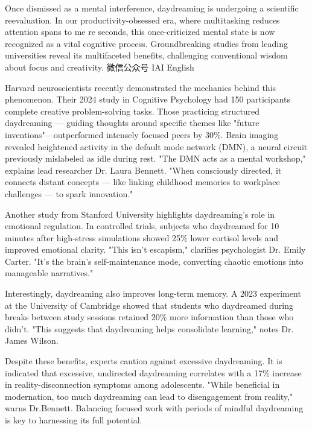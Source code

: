 \documentclass{英语试卷}
\begin{document}
\par Once dismissed as a mental interference, daydreaming is undergoing a scientific reevaluation. In our productivity-obsessed era, where multitasking reduces attention spans to me re seconds, this once-criticized mental state is now recognized as a vital cognitive process. Groundbreaking studies from leading universities reveal its multifaceted benefits, challenging conventional wisdom about focus and creativity. 微信公众号 IAI English\par
\par Harvard neuroscientists recently demonstrated the mechanics behind this phenomenon. Their 2024 study in Cognitive Psychology had 150 participants complete creative problem-solving tasks. Those practicing structured daydreaming — guiding thoughts around specific themes like "future inventions"—outperformed intensely focused peers by 30\%. Brain imaging revealed heightened activity in the default mode network (DMN), a neural circuit previously mislabeled as idle during rest. "The DMN acts as a mental workshop," explains lead researcher Dr. Laura Bennett. "When consciously directed, it connects distant concepts — like linking childhood memories to workplace challenges — to spark innovation."\par
\par Another study from Stanford University highlights daydreaming's role in emotional regulation. In controlled trials, subjects who daydreamed for 10 minutes after high-stress simulations showed 25\% lower cortisol levels and improved emotional clarity. "This isn't escapism," clarifies psychologist Dr. Emily Carter. "It's the brain's self-maintenance mode, converting chaotic emotions into manageable narratives."\par
\par Interestingly, daydreaming also improves long-term memory. A 2023 experiment at the University of Cambridge showed that students who daydreamed during breaks between study sessions retained 20\% more information than those who didn't. "This suggests that daydreaming helps consolidate learning," notes Dr. James Wilson.\par
\par Despite these benefits, experts caution against excessive daydreaming. It is indicated that excessive, undirected daydreaming correlates with a 17\% increase in reality-disconnection symptoms among adolescents. "While beneficial in modernation, too much daydreaming can lead to disengagement from reality," warns Dr.Bennett. Balancing focused work with periods of mindful daydreaming is key to harnessing its full potential.\par
\end{document}
